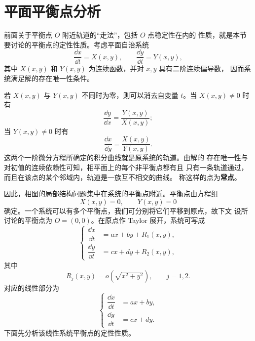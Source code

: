 \section{平面平衡点分析}\label{sec:平面平衡点分析}

前面关于平衡点 $O$ 附近轨道的“走法”，包括 $O$ 点稳定性在内的
性质，就是本节要讨论的平衡点的定性性质。考虑平面自治系统
\[
	\dfrac{\dd x}{\dd t}=X(x,y),
	\qquad
	\dfrac{\dd y}{\dd t}=Y(x,y),
\]
其中 $X(x,y)$ 和 $Y(x,y)$ 为连续函数，并对 $x,y$ 具有二阶连续偏导数，
因而系统满足解的存在唯一性条件。

若 $X(x,y)$ 与 $Y(x,y)$ 不同时为零，则可以消去自变量 $t$。当
$X(x,y)\neq0$ 时有
\[
	\dfrac{\dd y}{\dd x}=\dfrac{Y(x,y)}{X(x,y)};
\]
当 $Y(x,y)\neq0$ 时有
\[
	\dfrac{\dd x}{\dd y}=\dfrac{X(x,y)}{Y(x,y)}.
\]
这两个一阶微分方程所确定的积分曲线就是原系统的轨道。由解的
存在唯一性与对初值的连续依赖性可知，相平面上的每个非平衡点都有且
只有一条轨道通过，而且在该点的某个邻域内，轨道是一族互不相交的曲线。
称这样的点为\textbf{常点}。

因此，相图的局部结构问题集中在系统的平衡点附近。平衡点由方程组
\[
	X(x,y)=0,
	\qquad
	Y(x,y)=0
\]
确定。一个系统可以有多个平衡点，我们可分别将它们平移到原点，故下文
设所讨论的平衡点为 $O=(0,0)$。在原点作 Taylor 展开，系统可写成
\[
	\left\{
	\begin{aligned}
		\dfrac{\dd x}{\dd t}&=ax+by+R_1(x,y),\\
		\dfrac{\dd y}{\dd t}&=cx+dy+R_2(x,y),
	\end{aligned}
	\right.
\]
其中
\[
	R_j(x,y)=o\!\left(\sqrt{x^2+y^2}\right),
	\qquad j=1,2.
\]
对应的线性部分为
\[
	\left\{
	\begin{aligned}
		\dfrac{\dd x}{\dd t}&=ax+by,\\
		\dfrac{\dd y}{\dd t}&=cx+dy.
	\end{aligned}
	\right.
\]
下面先分析该线性系统平衡点的定性性质。

